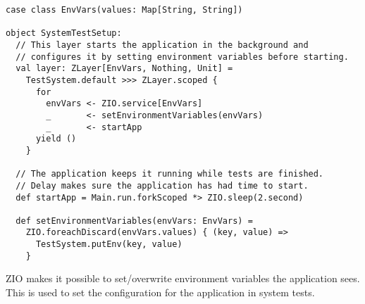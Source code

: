 \begin{algorithm}

\begin{verbatim}
case class EnvVars(values: Map[String, String])

object SystemTestSetup:
  // This layer starts the application in the background and
  // configures it by setting environment variables before starting.
  val layer: ZLayer[EnvVars, Nothing, Unit] =
    TestSystem.default >>> ZLayer.scoped {
      for
        envVars <- ZIO.service[EnvVars]
        _       <- setEnvironmentVariables(envVars)
        _       <- startApp
      yield ()
    }

  // The application keeps it running while tests are finished.
  // Delay makes sure the application has had time to start.
  def startApp = Main.run.forkScoped *> ZIO.sleep(2.second)

  def setEnvironmentVariables(envVars: EnvVars) =
    ZIO.foreachDiscard(envVars.values) { (key, value) =>
      TestSystem.putEnv(key, value)
    }
\end{verbatim}

\caption{ZIO  makes it possible to set/overwrite environment variables the application sees. This is used to set the configuration for the application in system tests. \label{casestudy:testsystem}}
\end{algorithm}